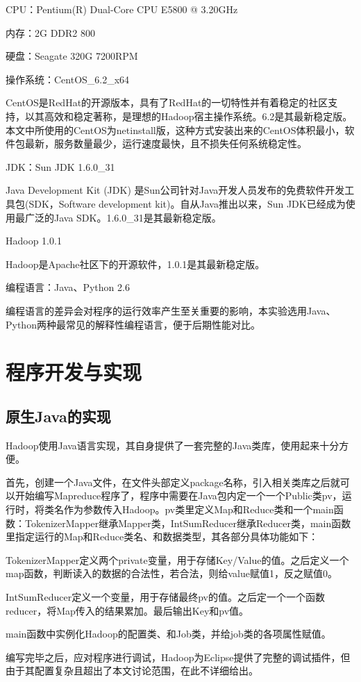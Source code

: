 CPU：Pentium(R) Dual-Core  CPU E5800 @ 3.20GHz

内存：2G DDR2 800

硬盘：Seagate 320G 7200RPM

操作系统：CentOS\_6.2\_x64
  
CentOS是RedHat的开源版本，具有了RedHat的一切特性并有着稳定的社区支持，以其高效和稳定著称，是理想的Hadoop宿主操作系统。6.2是其最新稳定版。本文中所使用的CentOS为netinstall版，这种方式安装出来的CentOS体积最小，软件包最新，服务数量最少，运行速度最快，且不损失任何系统稳定性。

JDK：Sun JDK 1.6.0\_31

Java Development Kit (JDK) 是Sun公司针对Java开发人员发布的免费软件开发工具包(SDK，Software development kit)。自从Java推出以来，Sun JDK已经成为使用最广泛的Java SDK。1.6.0\_31是其最新稳定版。

Hadoop 1.0.1

Hadoop是Apache社区下的开源软件，1.0.1是其最新稳定版。

编程语言：Java、Python 2.6

编程语言的差异会对程序的运行效率产生至关重要的影响，本实验选用Java、Python两种最常见的解释性编程语言，便于后期性能对比。


\section{程序开发与实现}
\subsection{原生Java的实现}
Hadoop使用Java语言实现，其自身提供了一套完整的Java类库，使用起来十分方便。

首先，创建一个Java文件，在文件头部定义package名称，引入相关类库之后就可以开始编写Mapreduce程序了，程序中需要在Java包内定一个一个Public类pv，运行时，将类名作为参数传入Hadoop。pv类里定义Map和Reduce类和一个main函数：TokenizerMapper继承Mapper类，IntSumReducer继承Reducer类，main函数里指定运行的Map和Reduce类名、和数据类型，其各部分具体功能如下：

TokenizerMapper定义两个private变量，用于存储Key/Value的值。之后定义一个map函数，判断读入的数据的合法性，若合法，则给value赋值1，反之赋值0。

IntSumReducer定义一个变量，用于存储最终pv的值。之后定一个一个函数reducer，将Map传入的结果累加。最后输出Key和pv值。

main函数中实例化Hadoop的配置类、和Job类，并给job类的各项属性赋值。

编写完毕之后，应对程序进行调试，Hadoop为Eclipse提供了完整的调试插件，但由于其配置复杂且超出了本文讨论范围，在此不详细给出。

